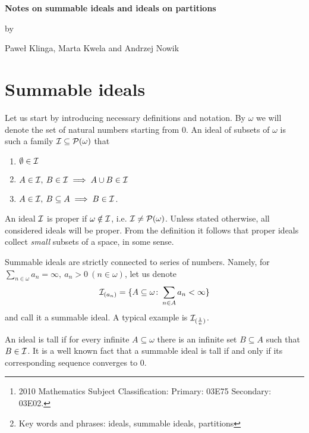 \documentclass[12pt]{article}
\theoremstyle{plain}
\theoremstyle{definition}
\theoremstyle{remark}
\newcommand{\cI}{{\cal I}}
\newcommand{\cP}{{\cal P}}
\begin{document}
\begin{center}{\bf \Large
		Notes on summable ideals and ideals on partitions
	}
\end{center}
\smallskip
\begin{center}
	by
\end{center}
\smallskip
\begin{center} Pawe\l{} Klinga, Marta Kwela and Andrzej Nowik
\end{center}

\begin{abstract}
	In this paper we prove a selection of theorems on summable ideals as well as ideals on partitions of sets.
	\let\thefootnote\relax\footnote{2010 Mathematics Subject Classification:  Primary: 03E75 Secondary: 03E02.
	}
	\let\thefootnote\relax\footnote{Key words and phrases: ideals, summable ideals, partitions}
\end{abstract}

\section{Summable ideals}

Let us start by introducing necessary definitions and notation. By $\omega$ we will denote the set of natural numbers starting from $0$. An ideal of subsets of $\omega$ is such a family $\cI \subseteq \cP(\omega)$ that
\begin{enumerate}
	\item $\emptyset \in \cI$
	\item $A\in \cI, \: B \in \cI \implies A\cup B \in \cI$
	\item $A\in \cI, \: B\subseteq A \implies B\in \cI$. 
\end{enumerate}
An ideal $\cI$ is proper if $\omega \notin \cI$, i.e. $\cI \neq \cP(\omega)$. Unless stated otherwise, all considered ideals will be proper. From the definition it follows that proper ideals collect \textit{small} subsets of a space, in some sense.

Summable ideals are strictly connected to series of numbers. Namely, for $\sum_{n\in\omega} a_n = \infty, \: a_n>0 \: (n\in\omega)$, let us denote
$$\cI_{(a_n)} = \{ A \subseteq \omega\colon \sum_{n\in A} a_n < \infty\}$$
and call it a summable ideal. A typical example is $\cI_{(\frac{1}{n})}$.

An ideal is tall if for every infinite $A\subseteq\omega$ there is an infinite set $B\subseteq A$ such that $B \in \cI$. It is a well known fact that a summable ideal is tall if and only if its corresponding sequence converges to $0$.
	
\end{document}
